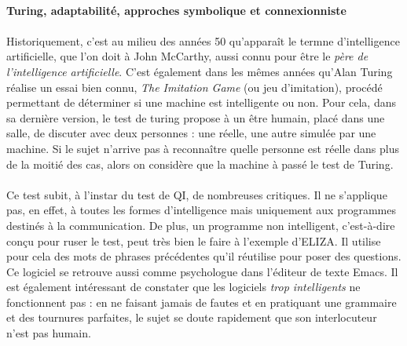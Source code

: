 \paragraph{Turing, adaptabilité, approches symbolique et connexionniste}

\paragraph{} Historiquement, c'est au milieu des années 50 qu'apparaît le termne d'intelligence artificielle, que l'on
doit à John McCarthy, aussi connu pour être le \emph{père de l'intelligence artificielle}. \cite{AI2} C'est également
dans les mêmes années qu'Alan Turing réalise un essai bien connu, \emph{The Imitation Game} (ou jeu d'imitation), procédé
permettant de déterminer si une machine est intelligente ou non. Pour cela, dans sa dernière version, le test de turing
propose à un être humain, placé dans une salle, de discuter avec deux personnes : une réelle, une autre simulée par une
machine. Si le sujet n'arrive pas à reconnaître quelle personne est réelle dans plus de la moitié des cas, alors on
considère que la machine à passé le test de Turing. \cite{Turing0}

\paragraph{} Ce test subit, à l'instar du test de QI, de nombreuses critiques. Il ne s'applique pas, en effet, à toutes
les formes d'intelligence mais uniquement aux programmes destinés à la communication. De plus, un programme \guillemotleft
non intelligent\guillemotright, c'est-à-dire conçu pour ruser le test, peut très bien le faire à l'exemple d'ELIZA.
\cite{Language0} Il utilise pour cela des mots de phrases précédentes qu'il réutilise pour poser des questions. Ce logiciel
se retrouve aussi comme psychologue dans l'éditeur de texte Emacs. \cite{Therapy0} Il est également intéressant de constater
que les logiciels \emph{trop intelligents} ne fonctionnent pas : en ne faisant jamais de fautes et en pratiquant une grammaire
et des tournures parfaites, le sujet se doute rapidement que son interlocuteur n'est pas humain.

